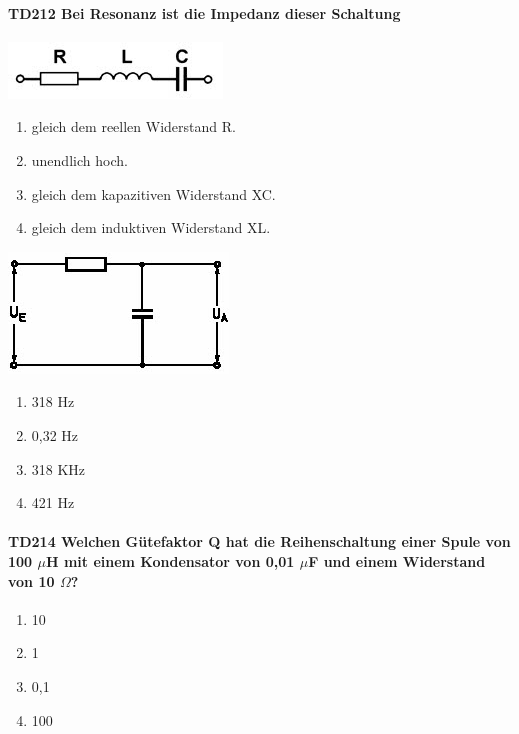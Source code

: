 \documentclass[8pt]{article}
\begin{document}
\begin{enumerate}
\begin{enumerate}[nolistsep,label=\Alph*]
{\paragraph*{TD212 Bei Resonanz ist die Impedanz dieser Schaltung}
\begin{center}
	\begin{minipage}{\linewidth}
		\centering
		\includegraphics[scale=1.0]{pics/td212_a.jpg}
	\end{minipage}
\end{center}
\begin{enumerate}[nolistsep,label=\Alph*]
\item gleich dem reellen Widerstand R.
\item unendlich hoch.
\item gleich dem kapazitiven Widerstand XC.
\item gleich dem induktiven Widerstand XL.
\end{enumerate}

\begin{center}
	\begin{minipage}{\linewidth}
		\centering
		\includegraphics[scale=1.0]{pics/td213_a.jpg}
	\end{minipage}
\end{center}
\begin{enumerate}[nolistsep,label=\Alph*]
\item 318 Hz
\item 0,32 Hz
\item 318 KHz
\item 421 Hz
\end{enumerate}

\paragraph*{TD214 Welchen Gütefaktor Q hat die Reihenschaltung einer Spule von 100 $\mu$H mit einem Kondensator von 0,01 $\mu$F und einem Widerstand von 10 $\Omega$?}
\begin{enumerate}[nolistsep,label=\Alph*]
\item 10
\item 1
\item 0,1
\item 100
\end{enumerate}

}
\end{enumerate}
\end{enumerate}
\end{document}

